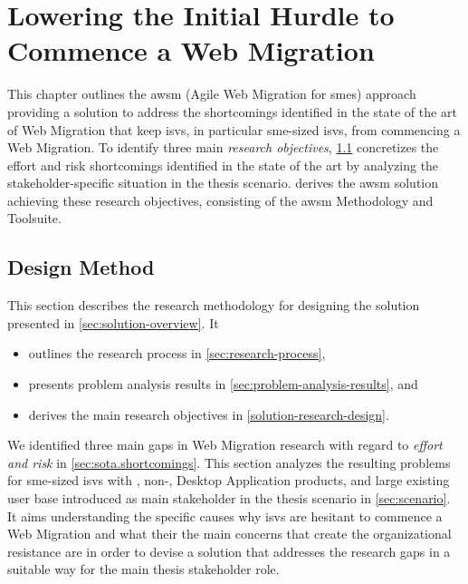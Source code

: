 \hypertarget{sec:solution}{%
\chapter{Lowering the Initial Hurdle to Commence a Web Migration}\label{sec:solution}}
This chapter outlines the \gls{awsm} (Agile Web Migration for \glspl{sme}) \autocite{Heil2016AWSM} approach providing a solution to address the shortcomings identified in the state of the art of \gls{Web Migration} that keep \glspl{isv}, in particular \gls{sme}-sized \glspl{isv}, from commencing a \gls{Web Migration}.
To identify three main \textit{research objectives}, \cref{design-method-and-considerations} concretizes the effort and risk shortcomings identified in the state of the art by analyzing the stakeholder-specific situation in the thesis scenario.
 derives the  \gls{awsm} solution achieving these research objectives, consisting of the \gls{awsm} Methodology and Toolsuite.

\hypertarget{design-method-and-considerations}{%
\section{Design Method}\label{design-method-and-considerations}}

This section describes the research methodology for designing the solution presented in \cref{sec:solution-overview}.
It 
\begin{itemize}
\item outlines the research process in \cref{sec:research-process},
\item presents problem analysis results in \cref{sec:problem-analysis-results}, and
\item derives the main research objectives in \cref{solution-research-design}.
\end{itemize}

We identified three main gaps in \gls{Web Migration} research with regard to \emph{effort and risk} in \cref{sec:sota.shortcomings}.
This section analyzes the resulting problems for \gls{sme}-sized \glspl{isv} with , non-, \gls{Desktop Application} products, and large existing user base introduced as main stakeholder in the thesis scenario in \cref{sec:scenario}.
It aims understanding the specific causes why \glspl{isv} are hesitant to commence a \gls{Web Migration} and what their the main concerns that create the organizational resistance are in order to devise a solution that addresses the research gaps in a suitable way for the main thesis stakeholder role.

